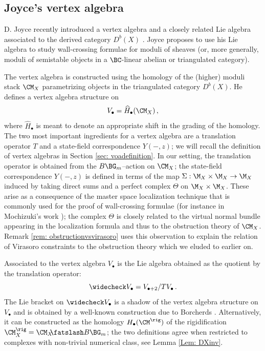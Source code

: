 \subsection{Joyce's vertex algebra}
\label{sec: introvertexalgebra}


D. Joyce recently introduced a vertex algebra and a closely related Lie algebra associated to the derived category $D^b(X)$ \cite{Jo17,GJT,Jo21}. Joyce proposes to use his Lie algebra to study wall-crossing formulae for moduli of sheaves (or, more generally, moduli of semistable objects in a $\BC$-linear abelian or triangulated category).

The vertex algebra is constructed using the homology of the (higher) moduli stack $\CM_X$ parametrizing objects in the triangulated category $D^b(X)$. He defines a vertex algebra structure on
\[V_\bullet=\widehat{H}_\bullet(\CM_X)\,,\]
where $\widehat{H}_\bullet$ is meant to denote an appropriate shift in the grading of the homology.
The two most important ingredients for a vertex algebra are a translation operator $T$ and a state-field correspondence $Y(-,z)$; we will recall the definition of vertex algebras in Section \ref{sec: voadefinition}. In our setting, the translation operator is obtained from the $B\BG_m$--action on $\CM_X$; the state-field correspondence $Y(-,z)$ is defined in terms of the map
$\Sigma:\M_X\times \M_X\to \M_X$ induced by taking direct sums and a perfect complex $\Theta$ on $\M_X\times \M_X$. These arise as a consequence of the master space localization technique that is commonly used for the proof of wall-crossing formulae (for instance in Mochizuki's work \cite{mochizuki}); the complex $\Theta$ is closely related to the virtual normal bundle appearing in the localization formula and thus to the obstruction theory of $\CM_X$. Remark \ref{rem: obstructionvsvirasoro} uses this observation to explain the relation of Virasoro constraints to the obstruction theory which we eluded to earlier on.

Associated to the vertex algebra $V_\bullet$ is the Lie algebra obtained as the quotient by the translation operator:
\[\widecheck V_{\bullet}= V_{\bullet+2}/T V_{\bullet}\,.\]
The Lie bracket on $\widecheck V_\bullet$ is a shadow of the vertex algebra structure on $V_\bullet$ and is obtained by a well-known construction due to Borcherds \cite{Borcherds}.
Alternatively, it can be constructed as the homology $H_\bullet(\CM^\rig)$ of the rigidification $\CM_X^\rig=\CM_X \mkern-7mu\fatslash B\BG_m$; the two definitions agree when restricted to complexes with non-trivial numerical class, see Lemma \ref{Lem: DXinv}.

